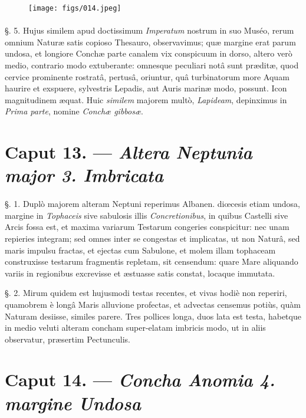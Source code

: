 \documentclass[a4paper, 11pt, oneside, polutonikogreek, german]{article}
\begin{document}
\begin{figure}[H]
\centering
\texttt{[image: figs/014.jpeg]}

\end{figure}
\paragraph{}
§. 5. Hujus similem apud doctissimum \emph{Imperatum} nostrum in suo Muséo, rerum omnium Naturæ satis copioso Thesauro, observavimus; quæ margine erat parum undosa, et longiore Conchæ parte canalem vix conspicuum in dorso, altero verò medio, contrario modo extuberante: omnesque peculiari notâ sunt præditæ, quod cervice prominente rostratâ, pertusâ, oriuntur, quâ turbinatorum more Aquam haurire et exspuere, sylvestris Lepadis, aut Auris marinæ modo, possunt. Icon magnitudinem æquat. Huic \emph{similem} majorem multò, \emph{Lapideam}, depinximus in \emph{Prima parte}, nomine \emph{Conchæ gibbosæ}.

\section{Caput 13. --- \emph{Altera Neptunia major 3. Imbricata}}
\paragraph{}
§. 1. Duplò majorem alteram Neptuni reperimus Albanen. diœcesis etiam undosa, margine in \emph{Tophaceis} sive sabulosis illis \emph{Concretionibus}, in quibus Castelli sive Arcis fossa est, et maxima variarum Testarum congeries conspicitur: nec unam repieries integram; sed omnes inter se congestas et implicatas, ut non Naturâ, sed maris impulsu fractas, et ejectas cum Sabulone, et molem illam tophaceam construxisse testarum fragmentis repletam, sit censendum: quare Mare aliquando variis in regionibus excrevisse et æstuasse satis constat, locaque immutata.

§. 2. Mirum quidem est hujusmodi testas recentes, et vivas hodiè non reperiri, quamobrem è longâ Maris alluvione profectas, et advectas censemus potiùs, quàm Naturam desiisse, similes parere. Tres pollices longa, duos lata est testa, habetque in medio veluti alteram concham super-elatam imbricis modo, ut in aliis observatur, præsertim Pectunculis.

\section{Caput 14. --- \emph{Concha Anomia 4. margine Undosa}}
\end{document}
